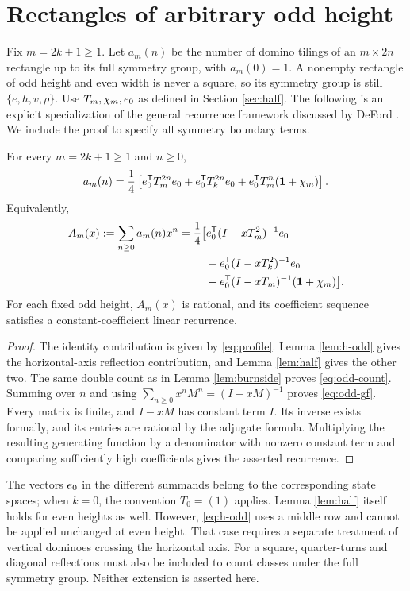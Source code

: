 \section{Rectangles of arbitrary odd height}\label{sec:odd}

Fix $m=2k+1\ge1$. Let $a_m(n)$ be the number of domino tilings
of an $m\times2n$ rectangle up to its full symmetry group,
with $a_m(0)=1$. A nonempty rectangle of odd height and even
width is never a square, so its symmetry group is still
$\{e,h,v,\rho\}$.
Use $T_m,\chi_m,e_0$ as defined in Section \ref{sec:half}.
The following is an explicit specialization of the general
recurrence framework discussed by DeFord \cite{deford}.
We include the proof to specify all symmetry boundary terms.

\begin{theorem}\label{thm:odd}
For every $m=2k+1\ge1$ and $n\ge0$,
\begin{equation}\label{eq:odd-count}
 a_m(n)=\frac14\left[
 e_0^{\mathsf T}T_m^{2n}e_0+
 e_0^{\mathsf T}T_k^{2n}e_0+
 e_0^{\mathsf T}T_m^n(\boldsymbol{1}+\chi_m)\right].
\end{equation}
Equivalently,
\begin{equation}\label{eq:odd-gf}
\begin{split}
 A_m(x):=\sum_{n\ge0}a_m(n)x^n
 =\frac14\bigl[&
 e_0^{\mathsf T}(I-xT_m^2)^{-1}e_0\\
 &+e_0^{\mathsf T}(I-xT_k^2)^{-1}e_0\\
 &+e_0^{\mathsf T}(I-xT_m)^{-1}(\boldsymbol{1}+\chi_m)\bigr].
\end{split}
\end{equation}
For each fixed odd height, $A_m(x)$ is rational, and its
coefficient sequence satisfies a constant-coefficient linear
recurrence.
\end{theorem}
\begin{proof}
The identity contribution is given by \eqref{eq:profile}.
Lemma \ref{lem:h-odd} gives the horizontal-axis reflection
contribution, and Lemma \ref{lem:half} gives the other two.
The same double count as in Lemma \ref{lem:burnside} proves
\eqref{eq:odd-count}.
Summing over $n$ and using
$\sum_{n\ge0}x^nM^n=(I-xM)^{-1}$ proves \eqref{eq:odd-gf}.
Every matrix is finite, and $I-xM$ has constant term $I$.
Its inverse exists formally, and its entries are rational
by the adjugate formula.
Multiplying the resulting generating function by a denominator
with nonzero constant term and comparing sufficiently high
coefficients gives the asserted recurrence.
\end{proof}

The vectors $e_0$ in the different summands belong to the
corresponding state spaces; when $k=0$, the convention
$T_0=(1)$ applies.
Lemma \ref{lem:half} itself holds for even heights as well.
However, \eqref{eq:h-odd} uses a middle row and cannot be
applied unchanged at even height.
That case requires a separate treatment of vertical dominoes
crossing the horizontal axis. For a square, quarter-turns and
diagonal reflections must also be included to count classes
under the full symmetry group.
Neither extension is asserted here.
